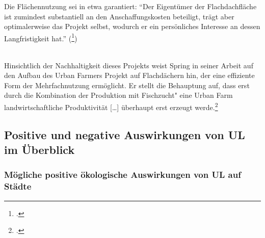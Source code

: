 \documentclass{scrartcl}
\begin{document}
Die Flächennutzung sei in etwa garantiert: “Der Eigentümer der Flachdachfläche ist zumindest substantiell an den Anschaffungskosten beteiligt, trägt aber optimalerweise das Projekt selbst, wodurch er ein persönliches Interesse an dessen Langfristigkeit hat.” (\footcite[Vgl.][S.37]{TobiasSpringDerBasel-Stadt})

\\
Hinsichtlich der Nachhaltigkeit dieses Projekts weist Spring in seiner Arbeit auf den Aufbau des Urban Farmers Projekt auf Flachdächern hin, der eine effiziente Form der Mehrfachnutzung ermöglicht. Er stellt die Behauptung auf, dass erst durch die Kombination der Produktion mit Fischzucht" eine Urban Farm landwirtschaftliche Produktivität […] überhaupt erst erzeugt werde.\footcite[S.47]{TobiasSpringDerBasel-Stadt} 



\subsection{Positive und negative Auswirkungen von UL im Überblick}
     \subsubsection{Mögliche positive ökologische Auswirkungen von UL auf Städte}  
     
\end{document}
